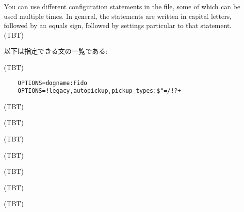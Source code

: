 You can use different configuration statements in the file, some
of which can be used multiple times.
In general, the statements are
written in capital letters, followed by an equals sign, followed by
settings particular to that statement.
(TBT)

以下は指定できる文の一覧である:

\blist{}
\item[\bb{OPTIONS}]
(TBT)

\begin{verbatim}
    OPTIONS=dogname:Fido
    OPTIONS=!legacy,autopickup,pickup_types:$"=/!?+
\end{verbatim}

\item[\bb{HACKDIR}]
(TBT)
\item[\bb{LEVELDIR}]
(TBT)
\item[\bb{SAVEDIR}]
(TBT)
\item[\bb{BONESDIR}]
(TBT)
\item[\bb{LOCKDIR}]
(TBT)
\item[\bb{TROUBLEDIR}]
(TBT)
\item[\bb{AUTOCOMPLETE}]
(TBT)

